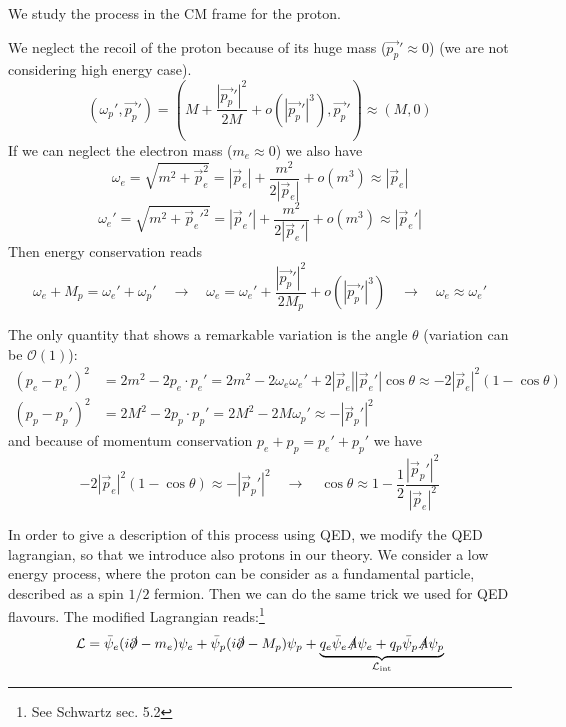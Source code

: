 \documentclass[TheoreticalPhy_ModB.tex]{subfiles}
\begin{document}
\skipline

We study the process in the CM frame for the proton.

\begin{figure}[H]
\centering

\end{figure}

We neglect the recoil of the proton because of its huge mass ($\vec{p_{p}}'\approx0$) (we are not considering high energy case). 
\[\left( \omega_{p} ',\vec{p_{p}} '\right)=\left( M+\frac{|\vec{p_{p}}'|^2}{2M}+o\left(|\vec{p_{p}}'|^{3}\right) ,\vec{p_{p}}'\right)\approx(M,0)\]
If we can neglect the electron mass ($m_e\approx0$) we also have
\[\omega_e=\sqrt{m^2+\vec p_e^2}=|\vec p_e|+\frac{m^2}{2|\vec p_e|}+o(m^3)\approx|\vec p_e|\]
\[\omega_e'=\sqrt{m^2+\vec p_e'^2}=|\vec p_e'|+\frac{m^2}{2|\vec p_e'|}+o(m^3)\approx|\vec p_e'|\]
Then energy conservation reads
\[\omega_e+M_p=\omega_e'+\omega_p'
\quad\rightarrow\quad
\omega_e=\omega_e'+\frac{|\vec{p_{p}}'|^2}{2M_p}+o\left(|\vec{p_{p}}'|^{3}\right)
\quad\rightarrow\quad
\omega_e\approx\omega_e'
\]

The only quantity that shows a remarkable variation is the angle $\theta$ (variation can be $\mathcal O(1)$):
\begin{align*}
(p_e-p_e')^2&=2m^2-2p_e\cdot p_e'=2m^2-2\omega_e\omega_e'+2|\vec p_e||\vec p_e'|\cos\theta\approx-2|\vec p_e|^2(1-\cos\theta)\\
(p_p-p_p')^2&=2M^2-2p_p\cdot p_p'=2M^2-2M\omega_p'\approx-|\vec p_p'|^2
\end{align*}
and because of momentum conservation $p_e+p_p=p_e'+p_p'$ we have
\[-2|\vec p_e|^2(1-\cos\theta)\approx-|\vec p_p'|^2
\quad\rightarrow\quad
\cos\theta\approx 1-\frac12\frac{|\vec p_p'|^2}{|\vec p_e|^2}\]

\skipline

In order to give a description of this process using QED, we modify the QED lagrangian, so that we introduce also protons in our theory. We consider a low energy process, where the proton can be consider as a fundamental particle, described as a spin $1/2$ fermion. Then we can do the same trick we used for QED flavours. The modified Lagrangian reads:\footnote{\textsf{See Schwartz sec. 5.2}}
\[\mathcal L=\bar\psi_e(i\slashed\partial-m_e)\psi_e+\bar\psi_p(i\slashed\partial-M_p)\psi_p+\underbrace{q_e\bar\psi_e\slashed A\psi_e+q_p\bar\psi_p\slashed A\psi_p}_{\mathcal L_{\textup{int}}}\]
\end{document}
